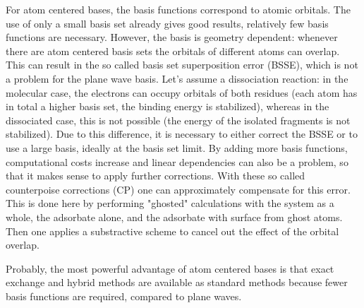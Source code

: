 \documentclass[11pt,DIV=13,BCOR=5mm,a4paper,headinclude]{scrbook}
\begin{document}
For atom centered bases, the basis functions correspond to atomic orbitals.
The use of only a small basis set already gives good results, relatively few basis functions are necessary.
However, the basis is geometry dependent: whenever there are atom centered basis sets the orbitals of different atoms can overlap.
This can result in the so called basis set superposition error (BSSE)\cite{BSSE1970}, which is not a problem for the plane wave basis.
Let's assume a dissociation reaction: in the molecular case, the electrons can occupy orbitals of both residues (each atom has in total a higher basis set, the binding energy is stabilized), whereas in the dissociated case, this is not possible (the energy of the isolated fragments is not stabilized).
Due to this difference, it is necessary to either correct the BSSE or to use a large basis, ideally at the basis set limit.
By adding more basis functions, computational costs increase and linear dependencies can also be a problem, so that it makes sense to apply further corrections.
With these so called counterpoise corrections (CP)\cite{Boys1970} one can approximately compensate for this error.
This is done here by performing "ghosted" calculations with the system as a whole, the adsorbate alone, and the adsorbate with surface from ghost atoms.
Then one applies a substractive scheme to cancel out the effect of the orbital overlap.

Probably, the most powerful advantage of atom centered bases is that exact exchange and hybrid methods are available as standard methods because fewer basis functions are required, compared to plane waves.
\end{document}
